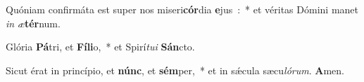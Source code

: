 ﻿\item Quóniam confirmáta est super nos miseri\textbf{cór}\-dia \textbf{e}jus~:~* et véritas Dómini manet \emph{in} \emph{æ}\textbf{tér}num.
\item Glória \textbf{Pá}tri, et \textbf{Fí}\-\textbf{li}\-o,~* et Spirí\emph{tu}\emph{i} \textbf{Sán}cto.
\item Sicut érat in princípio, et \textbf{núnc}, et \textbf{sém}\-per,~* et in sǽcula sæcu\emph{ló}\emph{rum}. \textbf{A}men.